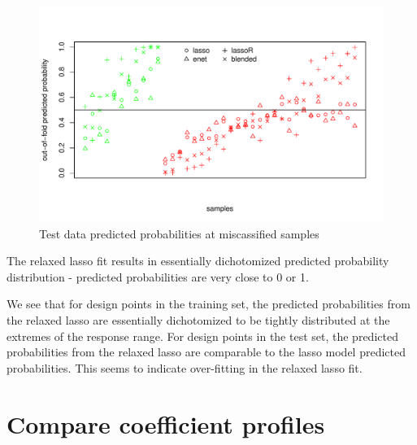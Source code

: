 \documentclass[
]{book}
\begin{document}
\begin{figure}
\centering
\includegraphics{Static/figures/hcc5hmC-glmnetFit-misclassTest-1.pdf}
\caption{\label{fig:hcc5hmC-glmnetFit-misclassTest}Test data predicted probabilities at miscassified samples}
\end{figure}

The relaxed lasso fit results in essentially dichotomized predicted probability
distribution - predicted probabilities are very close to 0 or 1.

We see that for design points in the training set, the predicted probabilities from the relaxed lasso
are essentially dichotomized to be tightly distributed at the extremes of the
response range. For design points in the test set, the predicted probabilities
from the relaxed lasso are comparable to the lasso model predicted probabilities.
This seems to indicate over-fitting in the relaxed lasso fit.

\hypertarget{compare-coefficient-profiles}{%
\section{Compare coefficient profiles}\label{compare-coefficient-profiles}}
\end{document}
